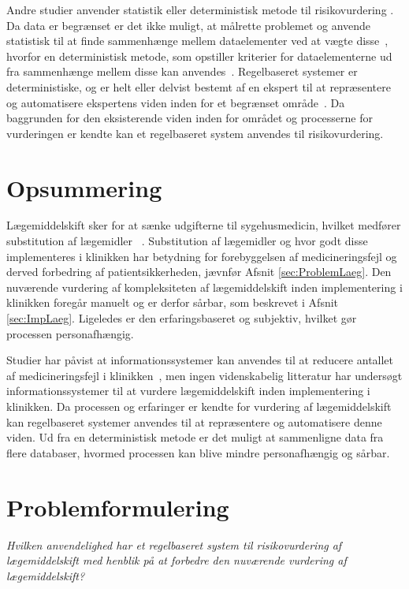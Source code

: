 Andre studier anvender statistik eller deterministisk metode til risikovurdering \citep{Geissert2018, Boyko1990, Rawshani2018}. Da data er begrænset er det ikke muligt, at målrette problemet og anvende statistisk til at finde sammenhænge mellem dataelementer ved at vægte disse~\citep{Campbell2008,Bruce2007}, hvorfor en deterministisk metode, som opstiller kriterier for dataelementerne ud fra sammenhænge mellem disse kan anvendes~\citep{Campbell2008}. Regelbaseret systemer er deterministiske, og er helt eller delvist bestemt af en ekspert til at repræsentere og automatisere ekspertens viden inden for et begrænset område~\citep{Crina2008}. Da baggrunden for den eksisterende viden inden for området og processerne for vurderingen er kendte kan et regelbaseret system anvendes til risikovurdering.

\section{Opsummering}
Lægemiddelskift sker for at sænke udgifterne til sygehusmedicin, hvilket medfører substitution af lægemidler ~\citep{Ess2003, Johnston2011}. Substitution af lægemidler og hvor godt disse implementeres i klinikken har betydning for forebyggelsen af medicineringsfejl og derved forbedring af patientsikkerheden, jævnfør Afsnit \ref{sec:ProblemLaeg}. Den nuværende vurdering af kompleksiteten af lægemiddelskift inden implementering i klinikken foregår manuelt og er derfor sårbar, som beskrevet i Afsnit \ref{sec:ImpLaeg}. Ligeledes er den erfaringsbaseret og subjektiv, hvilket gør processen personafhængig.

Studier har påvist at informationssystemer kan anvendes til at reducere antallet af medicineringsfejl i klinikken~\citep{Agrawal2009, Stenner2010, Fischer2008, Simpson2008}, men ingen videnskabelig litteratur har undersøgt informationssystemer til at vurdere lægemiddelskift inden implementering i klinikken. Da processen og erfaringer er kendte for vurdering af lægemiddelskift kan regelbaseret systemer anvendes til at repræsentere og automatisere denne viden. Ud fra en deterministisk metode er det muligt at sammenligne data fra flere databaser, hvormed processen kan blive mindre personafhængig og sårbar.

\section{Problemformulering}
\textit{Hvilken anvendelighed har et regelbaseret system til risikovurdering af lægemiddelskift med henblik på at forbedre den nuværende vurdering af lægemiddelskift?}





